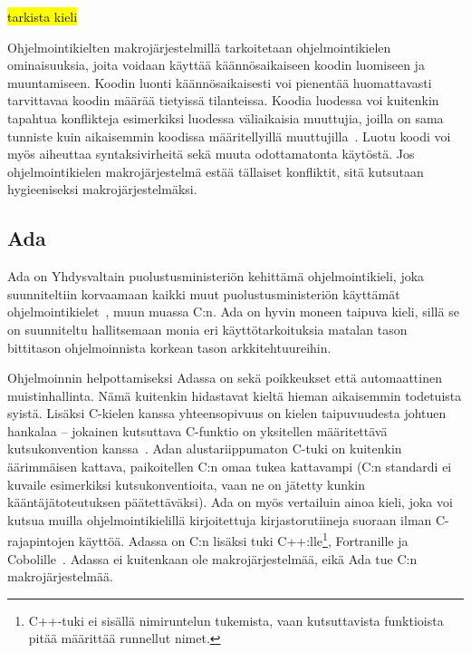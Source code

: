 \hl{tarkista kieli}

Ohjelmointikielten makrojärjestelmillä tarkoitetaan ohjelmointikielen
ominaisuuksia, joita voidaan käyttää käännösaikaiseen koodin luomiseen ja
muuntamiseen. Koodin luonti käännösaikaisesti voi pienentää huomattavasti
tarvittavaa koodin määrää tietyissä tilanteissa. Koodia luodessa voi kuitenkin 
tapahtua konflikteja esimerkiksi luodessa väliaikaisia muuttujia, joilla on
sama tunniste kuin aikaisemmin koodissa määritellyillä
muuttujilla~\citep{macrohygiene}. Luotu koodi voi myös aiheuttaa
syntaksivirheitä sekä muuta odottamatonta käytöstä. Jos ohjelmointikielen
makrojärjestelmä estää tällaiset konfliktit, sitä kutsutaan hygieeniseksi
makrojärjestelmäksi.

%

%

\subsection{Ada}

Ada on Yhdysvaltain puolustusministeriön kehittämä ohjelmointikieli, joka
suunniteltiin korvaamaan kaikki muut puolustusministeriön käyttämät
ohjelmointikielet~\citep{adahistory}, muun muassa C:n. Ada on hyvin moneen
taipuva kieli, sillä se on suunniteltu hallitsemaan monia eri
käyttötarkoituksia matalan tason bittitason ohjelmoinnista korkean tason
arkkitehtuureihin.

Ohjelmoinnin helpottamiseksi Adassa on sekä poikkeukset että automaattinen
muistinhallinta. Nämä kuitenkin hidastavat kieltä hieman aikaisemmin todetuista
syistä. Lisäksi C-kielen kanssa yhteensopivuus on kielen taipuvuudesta johtuen
hankalaa -- jokainen kutsuttava C-funktio on yksitellen määritettävä
kutsukonvention kanssa~\citep[s.~471]{ADA12}. Adan
alustariippumaton C-tuki on kuitenkin äärimmäisen kattava, paikoitellen C:n
omaa tukea kattavampi (C:n standardi ei kuvaile esimerkiksi kutsukonventioita,
vaan ne on jätetty kunkin kääntäjätoteutuksen päätettäväksi). Ada on myös
vertailuin ainoa kieli, joka voi kutsua muilla ohjelmointikielillä
kirjoitettuja kirjastorutiineja suoraan ilman C-rajapintojen käyttöä. Adassa on
C:n lisäksi tuki C++:lle\footnote{C++-tuki ei sisällä nimiruntelun tukemista,
vaan kutsuttavista funktioista pitää määrittää runnellut nimet.}, Fortranille
ja Cobolille~\citep[s.~585]{ADA12}. Adassa ei kuitenkaan ole makrojärjestelmää,
eikä Ada tue C:n makrojärjestelmää.

